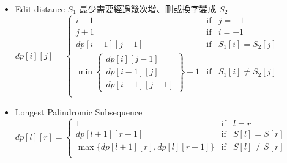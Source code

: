 \begin{itemize}

\item Edit distance
    \subitem $S_1$ 最少需要經過幾次增、刪或換字變成 $S_2$
    \subitem $dp[i][j] = \left \{
        \begin{array}{crc}
            i+1 & \mbox{if} & j=-1 \\
            j+1 & \mbox{if} & i=-1 \\
            dp[i-1][j-1] & \mbox{if} & S_1[i] = S_2[j] \\
            \min\left \{
                \begin{array}{c}
                    dp[i][j-1] \\ dp[i-1][j] \\ dp[i-1][j-1]
                \end{array}\right \}+1 & \mbox{if} & S_1[i] \neq S_2[j] \\
        \end{array}\right .$

\item Longest Palindromic Subsequence
    \subitem $dp[l][r] = \left \{
        \begin{array}{crc}
            1 & \mbox{if} & l = r \\
            dp[l+1][r-1] & \mbox{if} & S[l] = S[r] \\
            \max\{dp[l+1][r], dp[l][r-1]\} & \mbox{if} & S[l] \neq S[r] \\
        \end{array}\right .$

\end{itemize}